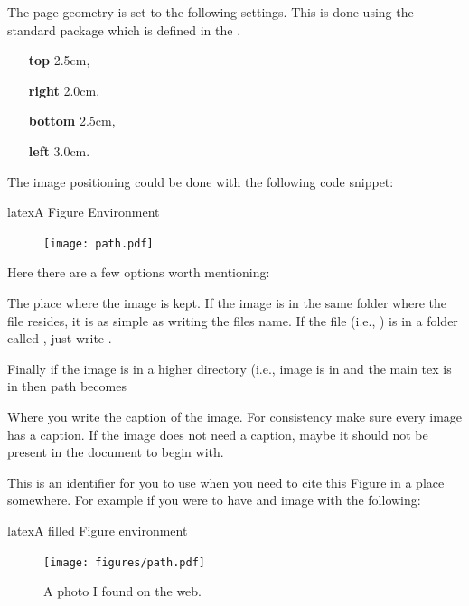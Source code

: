\documentclass[minted, draw, cover = contour]{../tex/hebdomon}
\begin{document}

The page geometry is set to the following settings. This is done using the
standard package \pcode{\usepackage{geometry}} which is defined in the
.
%
\begin{itemize}[leftmargin=!,labelindent=-29.2pt]
	\item[\textbf{top}] 2.5cm,
	\item[\textbf{right}] 2.0cm,
	\item[\textbf{bottom}] 2.5cm,
	\item[\textbf{left}] 3.0cm.
\end{itemize}
%
%
The image positioning could be done with the following code snippet:
%
\begin{Code}{latex}{A Figure Environment}
	\begin{figure}[ht]
		\centering
		\texttt{[image: path.pdf]}
		\caption{}\label{fig:...}
	\end{figure}
\end{Code}
%
Here there are a few options worth mentioning:
% 
\begin{hgitemize}
	\item[\pcode{path.pdf}] The place where the image is kept. If the
	image is in the same folder where the  file resides, it is as
	simple as writing the files name. If the file (i.e., ) is in a
	folder called , just write .
	\item[] Finally if the image is in a higher directory (i.e., image is in
	 and the main tex is in  then
	path becomes 
	\item[\pcode{\caption{..}}] Where you write the caption of the image.
	For consistency make sure every image has a caption. If the image does not
	need a caption, maybe it should not be present in the document to begin with.
	\item[\pcode{label{}}] This is an identifier for you to use when you need
	to cite this Figure in a place somewhere. For example if you were to have
	and image with the following:
\end{hgitemize}
%
\begin{Code}{latex}{A filled Figure environment}
	\begin{figure}[ht]
		\centering
		\texttt{[image: figures/path.pdf]}
		\caption{A photo I found on the web.}\label{fig:innsbruck}
	\end{figure}
\end{Code}
\end{document}
